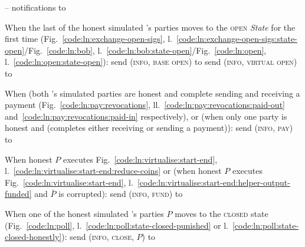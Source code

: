 \begin{center}
\begin{simulatorbox}{\simulator{} -- notifications to \fchan}
\begin{algorithmic}[1]
      \State When the last of the honest simulated \fchan's parties moves to the
      \textsc{open} \textit{State} for the first time
      (Fig.~\ref{code:ln:exchange-open-sigs},
      l.~\ref{code:ln:exchange-open-sigs:state-open}/Fig.~\ref{code:ln:bob},
      l.~\ref{code:ln:bob:state-open}/Fig.~\ref{code:ln:open},
      l.~\ref{code:ln:open:state-open}):
      \label{code:simulator:when-open}
      \Indent
          \State send (\textsc{info}, \textsc{base open}) to \fchan
          \label{code:simulator:base-open}
        \Else
          \State send (\textsc{info}, \textsc{virtual open}) to \fchan
          \label{code:simulator:virtual-open}
        \EndIf
      \EndIndent
      \Statex

      \State When (both \fchan's simulated parties are honest and complete
      sending and receiving a payment (Fig.~\ref{code:ln:pay:revocations},
      ll.~\ref{code:ln:pay:revocations:paid-out}
      and~\ref{code:ln:pay:revocations:paid-in} respectively), or (when only one
      party is honest and (completes either receiving or sending a payment)):
      \label{code:simulator:when-pay}
      \Indent
        \State send (\textsc{info}, \textsc{pay}) to \fchan
      \EndIndent
      \Statex

      \State When honest $P$ executes Fig.~\ref{code:ln:virtualise:start-end},
      l.~\ref{code:ln:virtualise:start-end:reduce-coins} or (when honest $P$
      executes Fig.~\ref{code:ln:virtualise:start-end},
      l.~\ref{code:ln:virtualise:start-end:helper-output-funded} and $\bar{P}$
      is corrupted): 
      \label{code:simulator:when-fund}
      \Indent
        \State send (\textsc{info}, \textsc{fund}) to \fchan
      \EndIndent
      \Statex

      \State When one of the honest simulated \fchan's parties $P$ moves to the
      \textsc{closed} state (Fig.~\ref{code:ln:poll},
      l.~\ref{code:ln:poll:state-closed-punished} or
      l.~\ref{code:ln:poll:state-closed-honestly}):
      \Indent
        \State send (\textsc{info}, \textsc{close}, $P$) to \fchan
      \EndIndent
    \end{algorithmic}
  \end{simulatorbox}
  \label{code:simulator}
\end{center} \ \\
